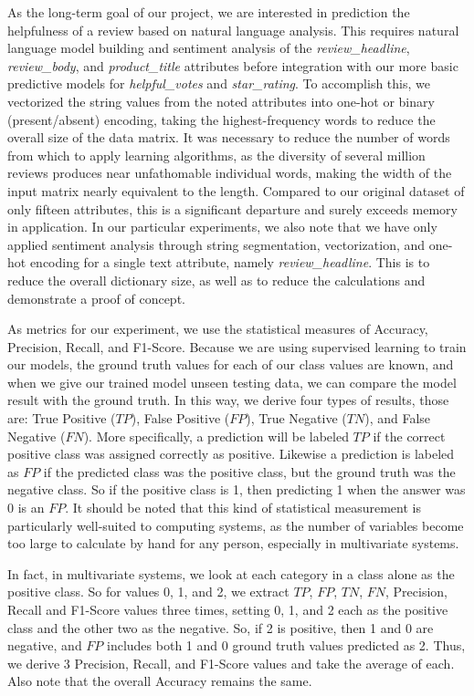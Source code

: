 \documentclass[10pt, conference, compsocconf]{IEEEtran}
\begin{document}
As the long-term goal of our project, we are interested in prediction the helpfulness of a review based on natural language analysis. This requires natural language model building and sentiment analysis of the \textit{review\_headline}, \textit{review\_body}, and \textit{product\_title} attributes before integration with our more basic predictive models for \textit{helpful\_votes} and \textit{star\_rating}. To accomplish this, we vectorized the string values from the noted attributes into one-hot or binary (present/absent) encoding, taking the highest-frequency words to reduce the overall size of the data matrix. It was necessary to reduce the number of words from which to apply learning algorithms, as the diversity of several million reviews produces near unfathomable individual words, making the width of the input matrix nearly equivalent to the length. Compared to our original dataset of only fifteen attributes, this is a significant departure and surely exceeds memory in application. In our particular experiments, we also note that we have only applied sentiment analysis through string segmentation, vectorization, and one-hot encoding for a single text attribute, namely \textit{review\_headline}. This is to reduce the overall dictionary size, as well as to reduce the calculations and demonstrate a proof of concept.

As metrics for our experiment, we use the statistical measures of Accuracy, Precision, Recall, and F1-Score. Because we are using supervised learning to train our models, the ground truth values for each of our class values are known, and when we give our trained model unseen testing data, we can compare the model result with the ground truth. In this way, we derive four types of results, those are: True Positive ($TP$), False Positive ($FP$), True Negative ($TN$), and False Negative ($FN$). More specifically, a prediction will be labeled $TP$ if the correct positive class was assigned correctly as positive. Likewise a prediction is labeled as $FP$ if the predicted class was the positive class, but the ground truth was the negative class. So if the positive class is 1, then predicting 1 when the answer was 0 is an $FP$. It should be noted that this kind of statistical measurement is particularly well-suited to computing systems, as the number of variables become too large to calculate by hand for any person, especially in multivariate systems. 

In fact, in multivariate systems, we look at each category in a class alone as the positive class. So for values 0, 1, and 2, we extract $TP$, $FP$, $TN$, $FN$, Precision, Recall and F1-Score values three times, setting 0, 1, and 2 each as the positive class and the other two as the negative. So, if 2 is positive, then 1 and 0 are negative, and $FP$ includes both 1 and 0 ground truth values predicted as 2. Thus, we derive 3 Precision, Recall, and F1-Score values and take the average of each. Also note that the overall Accuracy remains the same.
\end{document}
